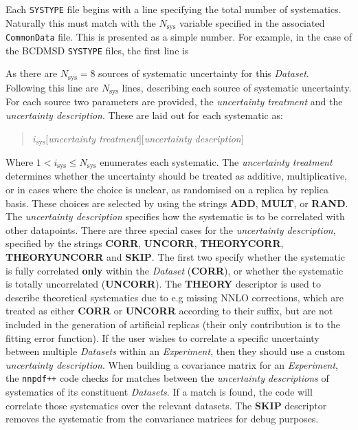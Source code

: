 \documentclass[11pt]{article}
\begin{document}
Each {\tt SYSTYPE} file begins with a line specifying the total number of systematics. Naturally this must match with the $N_{\text{sys}}$ variable specified in the associated {\tt CommonData} file. This is presented as a simple number. For example, in the case of the BCDMSD {\tt SYSTYPE} files, the first line is
\begin{quotation}
\end{quotation}
As there are $N_{\text{sys}}=8$ sources of systematic uncertainty for this \emph{Dataset}. Following this line are $N_{\text{sys}}$ lines, describing each source of systematic uncertainty. For each source two parameters are provided, the \emph{uncertainty treatment} and the \emph{uncertainty description}. These are laid out for each systematic as:
\begin{quotation}\noindent
$i_{\text{sys}}$\quad $[$\emph{uncertainty treatment}$]$\quad $[$\emph{uncertainty description}$]$
\end{quotation}
Where $1< i_{\text{sys}} \leq N_{\mathrm{sys}}$ enumerates each systematic. The \emph{uncertainty treatment} determines whether the uncertainty should be treated as additive, multiplicative, or in cases where the choice is unclear, as randomised on a replica by replica basis. These choices are selected by using the strings \textbf{ADD}, \textbf{MULT}, or \textbf{RAND}. The \emph{uncertainty description} specifies how the systematic is to be correlated with other datapoints. There are three special cases for the \emph{uncertainty description}, specified by the strings \textbf{CORR}, \textbf{UNCORR}, \textbf{THEORYCORR}, \textbf{THEORYUNCORR} and \textbf{SKIP}. The first two specify whether the systematic is fully correlated \textbf{only} within the \emph{Dataset} (\textbf{CORR}), or whether the systematic is totally uncorrelated (\textbf{UNCORR}). The \textbf{THEORY} descriptor is used to describe theoretical systematics due to e.g missing NNLO corrections, which are treated as either \textbf{CORR} or \textbf{UNCORR} according to their suffix, but are not included in the generation of artificial replicas (their only contribution is to the fitting error function). If the user wishes to correlate a specific uncertainty between multiple \emph{Datasets} within an \emph{Experiment}, then they should use a custom \emph{uncertainty description}. When building a covariance matrix for an \emph{Experiment}, the {\tt nnpdf++} code checks for matches between the \emph{uncertainty descriptions} of systematics of its constituent \emph{Datasets}. If a match is found, the code will correlate those systematics over the relevant datasets. The \textbf{SKIP} descriptor removes the systematic from the convariance matrices for debug purposes.
\end{document}
